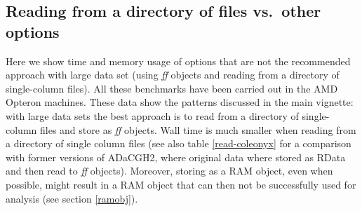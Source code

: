 \documentclass[a4paper,11pt]{article}
\begin{document}
\subsection{Reading from a directory of files vs.\ other options}

Here we show time and memory usage of options that are not the recommended
approach with large data set (using \textit{ff} objects and reading from a
directory of single-column files). All these benchmarks have been carried
out in the AMD Opteron machines. These data show the patterns discussed in
the main vignette: with large data sets the best approach is to read from
a directory of single-column files and store as \textit{ff} objects. Wall
time is much smaller when reading from a directory of single column files
(see also table \ref{read-coleonyx} for a comparison with former versions
of ADaCGH2, where original data where stored as RData and then read to
\textit{ff} objects). Moreover, storing as a RAM object, even when
possible, might result in a RAM object that can then not be successfully
used for analysis (see section \ref{ramobj}).


\renewcommand{\arraystretch}{1.8}
\end{document}
